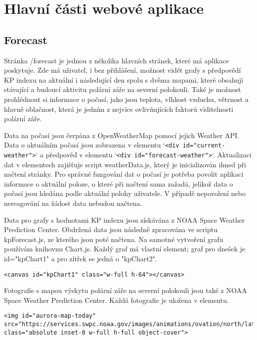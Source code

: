 \section{Hlavní části webové aplikace}

\subsection{Forecast}

\par Stránka /forecast je jednou z několika hlavních stránek, které má aplikace poskytuje. Zde má uživatel, i bez přihlášení, možnost vidět grafy s předpovědí KP indexu na aktuální i následující den spolu s dvěma mapami, které obsahují stávající a budoucí aktivitu polární záře na severní polokouli. Také je možnost prohlédnout si informace o počasí, jako jsou teplota, vlhkost vzduchu, větrnost a hlavně oblačnost, která je jedním z nejvíce ovlivňujících faktorů viditelnosti polární záře.
\par Data na počasí jsou čerpána z OpenWeatherMap pomocí jejich Weather API. Data o aktuálním počasí jsou zobrazena v elementu `\texttt{<div id="current-weather"\>>}` a předpověď v elementu `\texttt{<div id="forecast-weather"\>>}`. Aktualizaci dat v elementech zajišťuje script weatherData.js, který je inicializován ihned při načtení stránky. Pro správné fungování dat o počasí je potřeba povolit aplikaci informace o aktuální poloze, o které při načtení sama zažadá, jelikož data o počasí jsou hledána podle aktuální polohy uživatele. V případě nepovolení nebo nereagování na žádost data nebudou načtena.
\par Data pro grafy s hodnotami KP indexu jsou získávána z NOAA Space Weather Prediction Center. Obdržená data jsou následně zpracována ve scriptu kpForecast.js, ze kterého jsou poté načtena. Na samotné vytvoření grafu používám knihovnu Chart.js. Každý graf má vlastní element; graf pro dnešek je id="kpChart1" a pro zítřek se jedná o "kpChart2".

\begin{lstlisting}[caption = {Element s aktuální tabulkou KP indexu},label = {lst:stranka}]
<canvas id="kpChart1" class="w-full h-64"></canvas>
\end{lstlisting}

\par Fotografie s mapou výskytu polární záře na severní polokouli jsou také z NOAA Space Weather Prediction Center. Každá fotografie je uložena v elementu.

\begin{lstlisting}[caption = {Element s aktuální mapou polární záře},label = {lst:stranka}]
<img id="aurora-map-today" src="https://services.swpc.noaa.gov/images/animations/ovation/north/latest.jpg" class="absolute inset-0 w-full h-full object-cover">
\end{lstlisting}

